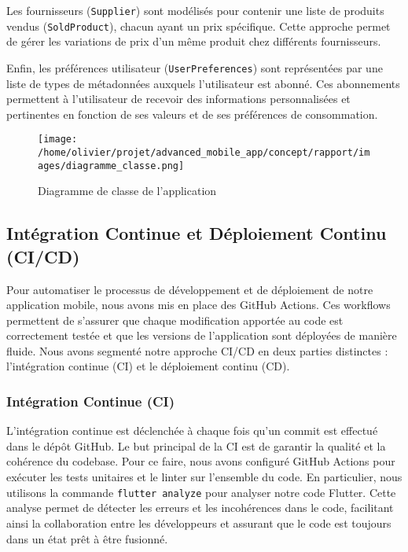 Les fournisseurs (\texttt{Supplier}) sont modélisés pour contenir une liste de produits vendus (\texttt{SoldProduct}), chacun ayant un prix spécifique. Cette approche permet de gérer les variations de prix d'un même produit chez différents fournisseurs.

Enfin, les préférences utilisateur (\texttt{UserPreferences}) sont représentées par une liste de types de métadonnées auxquels l'utilisateur est abonné. Ces abonnements permettent à l'utilisateur de recevoir des informations personnalisées et pertinentes en fonction de ses valeurs et de ses préférences de consommation.

\begin{figure}[h]
    \centering
    \texttt{[image: /home/olivier/projet/advanced\_mobile\_app/concept/rapport/images/diagramme\_classe.png]}
    \caption{Diagramme de classe de l'application}
    \label{fig:diagramme_classe}
\end{figure}

\subsection{Intégration Continue et Déploiement Continu (CI/CD)}
\label{sec:ci_cd}
Pour automatiser le processus de développement et de déploiement de notre application mobile, nous avons mis en place des GitHub Actions. Ces workflows permettent de s'assurer que chaque modification apportée au code est correctement testée et que les versions de l'application sont déployées de manière fluide. Nous avons segmenté notre approche CI/CD en deux parties distinctes : l'intégration continue (CI) et le déploiement continu (CD).

\subsubsection{Intégration Continue (CI)}

L'intégration continue est déclenchée à chaque fois qu'un commit est effectué dans le dépôt GitHub. Le but principal de la CI est de garantir la qualité et la cohérence du codebase. Pour ce faire, nous avons configuré GitHub Actions pour exécuter les tests unitaires et le linter sur l'ensemble du code. En particulier, nous utilisons la commande \texttt{flutter analyze} pour analyser notre code Flutter. Cette analyse permet de détecter les erreurs et les incohérences dans le code, facilitant ainsi la collaboration entre les développeurs et assurant que le code est toujours dans un état prêt à être fusionné.

